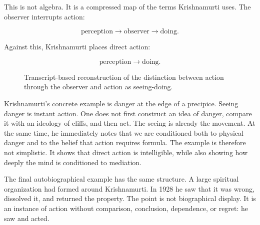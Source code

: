 This is not algebra. It is a compressed map of the terms Krishnamurti uses. The observer interrupts action:

\begin{equation}
\text{perception}
\longrightarrow
\text{observer}
\longrightarrow
\text{doing}.
\end{equation}

Against this, Krishnamurti places direct action:

\begin{equation}
\text{perception}
\longrightarrow
\text{doing}.
\end{equation}

\begin{figure}
\centering
{}
\caption{Transcript-based reconstruction of the distinction between action through the observer and action as seeing-doing.}
\end{figure}

Krishnamurti's concrete example is danger at the edge of a precipice. Seeing danger is instant action. One does not first construct an idea of danger, compare it with an ideology of cliffs, and then act. The seeing is already the movement. At the same time, he immediately notes that we are conditioned both to physical danger and to the belief that action requires formula. The example is therefore not simplistic. It shows that direct action is intelligible, while also showing how deeply the mind is conditioned to mediation.

The final autobiographical example has the same structure. A large spiritual organization had formed around Krishnamurti. In 1928 he saw that it was wrong, dissolved it, and returned the property. The point is not biographical display. It is an instance of action without comparison, conclusion, dependence, or regret: he saw and acted.

